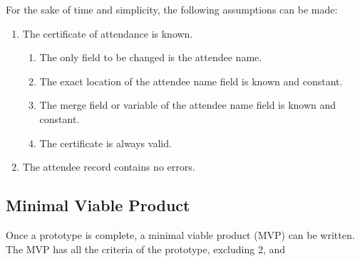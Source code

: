 \documentclass[11pt]{article}
\begin{document}
\noindent
For the sake of time and simplicity, the following assumptions can be made:

\begin{enumerate}
    \item The certificate of attendance is known.
    \begin{enumerate}
        \item The only field to be changed is the attendee name.
        \item The exact location of the attendee name field is known and constant.
        \item The merge field or variable of the attendee name field is known and constant.
        \item The certificate is always valid.
    \end{enumerate}
    \item The attendee record contains no errors.
\end{enumerate}

\subsection{Minimal Viable Product}

Once a prototype is complete, a minimal viable product (MVP) can be written. The MVP has all the criteria of the prototype, excluding 2, and
\end{document}
